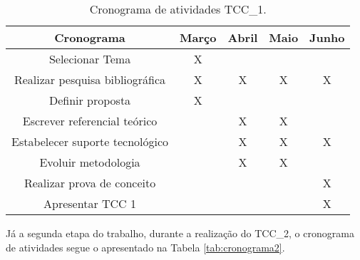 \begin{table}[H]
	\centering
	\caption{Cronograma de atividades TCC\_1.}
	\label{tab:cronograma1}
	\begin{tabular}{@{}ccccc@{}}
		\toprule 
		\textbf{Cronograma}             & \textbf{Março} & \textbf{Abril} & \textbf{Maio} & \textbf{Junho} \\ \midrule
		Selecionar Tema                 & X              &                &               &                \\ \midrule
		Realizar pesquisa bibliográfica & X              & X              & X             & X              \\ \midrule
		Definir proposta                & X              &                &               &                \\ \midrule
		Escrever referencial teórico    &                & X              & X             &                \\ \midrule
		Estabelecer suporte tecnológico &                & X              & X             & X              \\ \midrule
		Evoluir metodologia             &                & X              & X             &                \\ \midrule
		Realizar prova de conceito      &                &                &               & X              \\ \midrule
		Apresentar TCC 1                &                &                &               & X              \\ \bottomrule
	\end{tabular}
\end{table}

Já a segunda etapa do trabalho, durante a realização do TCC\_2, o cronograma de atividades segue o apresentado na Tabela \ref{tab:cronograma2}.

